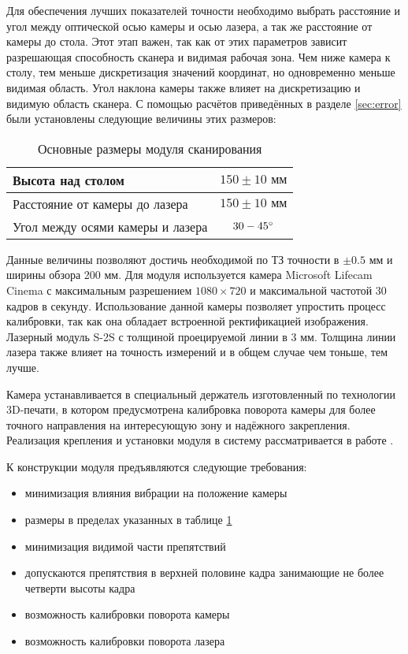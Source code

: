         Для обеспечения лучших показателей точности необходимо выбрать расстояние и угол между оптической осью камеры и осью лазера, а так же расстояние от камеры до стола. Этот этап важен, так как от этих параметров зависит разрешающая способность сканера и видимая рабочая зона. Чем ниже камера к столу, тем меньше дискретизация значений координат, но одновременно меньше видимая область. Угол наклона камеры также влияет на дискретизацию и видимую область сканера.
        С помощью расчётов приведённых в разделе \ref{sec:error} были установлены следующие величины этих размеров:
        \begin{table}[H]
            \centering
            \caption{Основные размеры модуля сканирования}\label{table:dims}
            \begin{tabular}{|l|c|} \hline
                Высота над столом& $ 150  \pm 10 \text{ мм} $\\ \hline
                Расстояние от камеры до лазера& $ 150  \pm 10 \text{ мм} $\\ \hline
                Угол между осями камеры и лазера& $ 30-45^{\circ} $\\ \hline
            \end{tabular}
        \end{table}
        Данные величины позволяют достичь необходимой по ТЗ точности в $ \pm 0.5 \text{ мм} $ и ширины обзора 200 мм.
        Для модуля используется камера Microsoft Lifecam Cinema с максимальным разрешением $ 1080 
        \times 720 $ и максимальной частотой 30 кадров в секунду. Использование данной камеры позволяет упростить процесс калибровки, так как она обладает встроенной ректификацией изображения. Лазерный модуль S-2S с толщиной проецируемой линии в 3 мм. Толщина линии лазера также влияет на точность измерений и в общем случае чем тоньше, тем лучше.

        Камера устанавливается в специальный держатель изготовленный по технологии 3D-печати, в котором предусмотрена калибровка поворота камеры для более точного направления на интересующую зону и надёжного закрепления. Реализация крепления и установки модуля в систему рассматривается в работе . 

        К конструкции модуля предъявляются следующие требования:
        \begin{itemize}
            \item минимизация влияния вибрации на положение камеры
            \item размеры в пределах указанных в таблице \ref{table:dims}
            \item минимизация видимой части препятствий
            \item допускаются препятствия в верхней половине кадра занимающие не более четверти высоты кадра
            \item возможность калибровки поворота камеры
            \item возможность калибровки поворота лазера
        \end{itemize}
    
